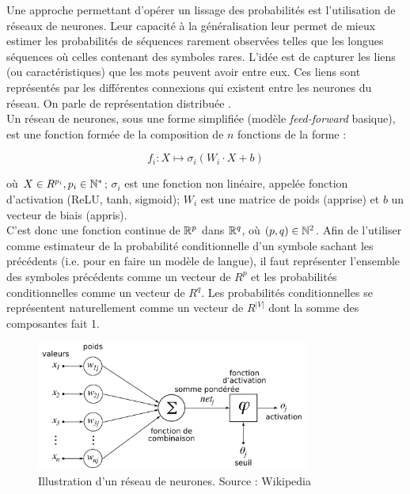 Une approche permettant d'opérer un lissage des probabilités est l'utilisation de réseaux de neurones.
Leur capacité à la généralisation leur permet de mieux estimer les probabilités de séquences rarement observées telles que les longues séquences où celles contenant des symboles rares.
L'idée est de capturer les liens (ou caractéristiques) que les mots peuvent avoir entre eux. Ces liens sont représentés par les différentes connexions qui existent entre les neurones du réseau.
On parle de \og représentation distribuée \fg{}. \\

Un réseau de neurones, sous une forme simplifiée (modèle \textit{feed-forward} basique), est une fonction formée de la composition de $n$ fonctions de la forme :

\[ f_i : X \mapsto \sigma_i(W_i\cdot X + b) \]

où $X \in R^{p_i}, p_i \in \mathbb{N}^*$; $\sigma_i$ est une fonction non linéaire, appelée fonction d'activation (ReLU, tanh, sigmoid); $W_i$ est une matrice de poids (apprise) et $b$ un vecteur de biais (appris). \\

C'est donc une fonction continue de $\mathbb{R}^p$ dans $\mathbb{R}^q$, où $(p,q) \in \mathbb{N}^2$. Afin de l'utiliser comme estimateur de la probabilité conditionnelle d'un symbole sachant les précédents (i.e. pour en faire un modèle de langue), il faut représenter l'ensemble des symboles précédents comme un vecteur de $R^p$ et les probabilités conditionnelles comme un vecteur de $R^q$.
Les probabilités conditionnelles se représentent naturellement comme un vecteur de $R^{\vert V \vert}$ dont la somme des composantes fait 1.

\begin{figure}[h]
\begin{center}
  \includegraphics[width=0.8\textwidth]{img/NN.png}
  \caption{Illustration d'un réseau de neurones. Source : Wikipedia}
\end{center}
\end{figure}


